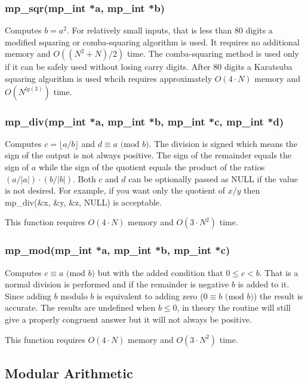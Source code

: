 \documentclass{article}
\begin{document}
\subsubsection{mp\_sqr(mp\_int *a, mp\_int *b)}
Computes $b = a^2$. 
For relatively small inputs, that is less than 80 digits a modified squaring or comba-squaring algorithm is used.  It
requires no additional memory and $O((N^2 + N)/2)$ time.  The comba-squaring method is used only if it can be safely used
without losing carry digits.  After 80 digits a Karatsuba squaring algorithm is used whcih requires approximately 
$O(4 \cdot N)$ memory and $O(N^{lg(3)})$ time.

\subsubsection{mp\_div(mp\_int *a, mp\_int *b, mp\_int *c, mp\_int *d)}
Computes $c = \lfloor a/b \rfloor$ and $d \equiv a \mbox{ (mod }b\mbox{)}$.  The division is signed which means the sign
of the output is not always positive.  The sign of the remainder equals the sign of $a$ while the sign of the 
quotient equals the product of the ratios $(a/\vert a \vert) \cdot (b/\vert b \vert)$.  Both $c$ and $d$ can be 
optionally passed as NULL if the value is not desired.  For example, if you want only the quotient of $x/y$ then 
mp\_div(\&x, \&y, \&z, NULL) is acceptable.

This function requires $O(4 \cdot N)$ memory and $O(3 \cdot N^2)$ time.

\subsubsection{mp\_mod(mp\_int *a, mp\_int *b, mp\_int *c)}
Computes $c \equiv a \mbox{ (mod }b\mbox{)}$ but with the added condition that $0 \le c < b$.  That is a normal 
division is performed and if the remainder is negative $b$ is added to it.  Since adding $b$ modulo $b$ is equivalent
to adding zero ($0 \equiv b \mbox{ (mod }b\mbox{)}$) the result is accurate.  The results are undefined 
when $b \le 0$, in theory the routine will still give a properly congruent answer but it will not always be positive. 

This function requires $O(4 \cdot N)$ memory and $O(3 \cdot N^2)$ time.

\subsection{Modular Arithmetic}
\end{document}
